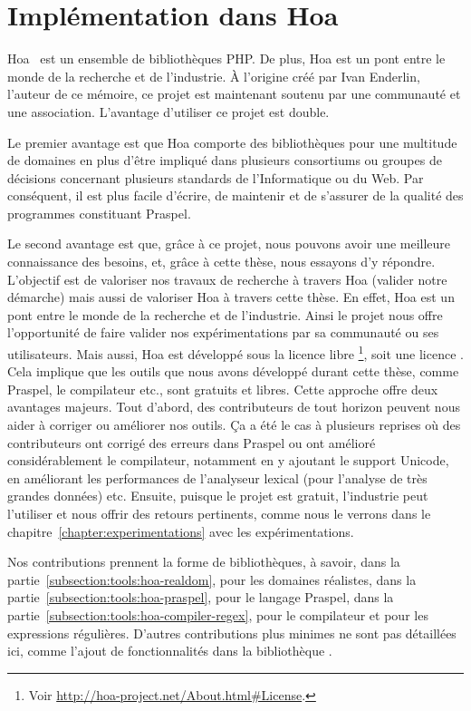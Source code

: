 \section{Implémentation dans Hoa}
\label{section:tools:hoa}

Hoa~ est un ensemble de bibliothèques PHP. De plus, Hoa est un pont
entre le monde de la recherche et de l'industrie. À l'origine créé par Ivan
Enderlin, l'auteur de ce mémoire, ce projet est maintenant soutenu par une
communauté et une association. L'avantage d'utiliser ce projet est double.

Le premier avantage est que Hoa comporte des bibliothèques pour une multitude de
domaines en plus d'être impliqué dans plusieurs consortiums ou groupes de
décisions concernant plusieurs standards de l'Informatique ou du Web. Par
conséquent, il est plus facile d'écrire, de maintenir et de s'assurer de la
qualité des programmes constituant Praspel.

Le second avantage est que, grâce à ce projet, nous pouvons avoir une meilleure
connaissance des besoins, et, grâce à cette thèse, nous essayons d'y répondre.
L'objectif est de valoriser nos travaux de recherche à travers Hoa (valider
notre démarche) mais aussi de valoriser Hoa à travers cette thèse. En effet, Hoa
est un pont entre le monde de la recherche et de l'industrie. Ainsi le projet
nous offre l'opportunité de faire valider nos expérimentations par sa communauté
ou ses utilisateurs. Mais aussi, Hoa est développé sous la licence libre
\footnote{Voir
\url{http://hoa-project.net/About.html\#License}.}, soit une licence
. Cela implique que les outils que nous avons développé
durant cette thèse, comme Praspel, le compilateur etc., sont gratuits et libres.
Cette approche offre deux avantages majeurs. Tout d'abord, des contributeurs de
tout horizon peuvent nous aider à corriger ou améliorer nos outils. Ça a été le
cas à plusieurs reprises où des contributeurs ont corrigé des erreurs dans
Praspel ou ont amélioré considérablement le compilateur, notamment en y ajoutant
le support Unicode, en améliorant les performances de l'analyseur lexical (pour
l'analyse de très grandes données) etc. Ensuite, puisque le projet est gratuit,
l'industrie peut l'utiliser et nous offrir des retours pertinents, comme nous le
verrons dans le chapitre~\ref{chapter:experimentations} avec les
expérimentations.

Nos contributions prennent la forme de bibliothèques, à savoir, dans la
partie~\ref{subsection:tools:hoa-realdom},  pour les
domaines réalistes, dans la partie~\ref{subsection:tools:hoa-praspel},
 pour le langage Praspel, dans la
partie~\ref{subsection:tools:hoa-compiler-regex}, 
pour le compilateur et  pour les expressions
régulières. D'autres contributions plus minimes ne sont pas détaillées ici,
comme l'ajout de fonctionnalités dans la bibliothèque .

